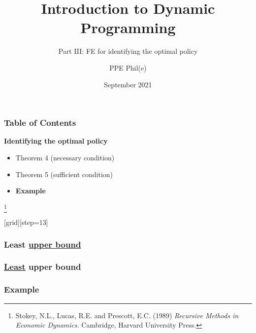 \documentclass[aspectratio=169]{beamer}
\title[Dynamic Programming Part III] %
{Introduction to Dynamic Programming}
\subtitle{Part III: FE for identifying the optimal policy}
\author[PPE Phil(e)]
{PPE Phil(e)\inst{1}}
\institute[] %
{
  \inst{1}%
  material @ https://github.com/PPEphile
}
\date[2021] %
{September 2021}
\newcommand\blfootnote[1]{%
\begingroup
\renewcommand\thefootnote{}\footnote{#1}%
\addtocounter{footnote}{-1}%
\endgroup
}
\begin{document}
\frame{\titlepage}

\begin{frame}
\frametitle{Table of Contents}
\textbf{Identifying the \color{teal} optimal policy} \color{black} 
\begin{itemize}
\item Theorem 4 (necessary condition)
\item Theorem 5 (sufficient condition)
\item \textbf{Example}
\end{itemize}

\blfootnote{Stokey, N.L., Lucas, R.E. and Prescott, E.C. (1989) \textit{Recursive Methods in Economic Dynamics}. Cambridge, Harvard University Press.}

\end{frame}


{
[grid][step=13]

\begin{frame}
\frametitle{Least \underline{upper bound}}
\end{frame}

\begin{frame}
\frametitle{\underline{Least} upper bound}
\end{frame}

\begin{frame}[t]
\frametitle{Example}

\end{frame}

}
\end{document}
